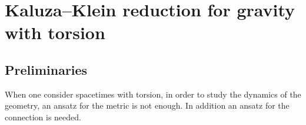 \chapter{Kaluza--Klein reduction for gravity with torsion}

\section{Preliminaries}

When one consider spacetimes with torsion, in order to study the dynamics of the geometry, an ansatz for the metric is not enough. In addition an ansatz for the connection is needed.


\nocite{German:1993bq,Aros:2007nn}
\nocite{MuellerHoissen:1989yv,Mardones:1990qc}
